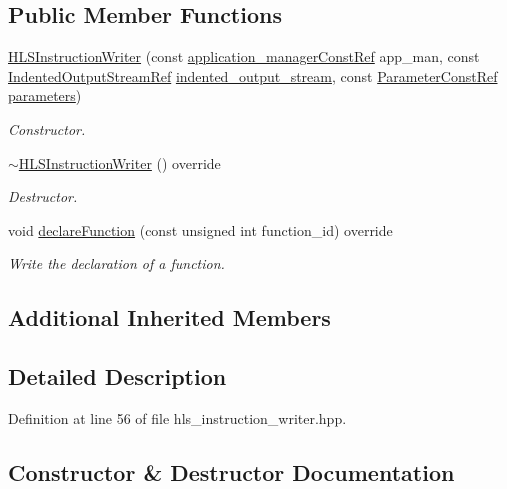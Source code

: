 \subsection*{Public Member Functions}
\begin{DoxyCompactItemize}
\item 
\hyperlink{classHLSInstructionWriter_ae416bfd458712b3bbc747e19e9aa1467}{H\+L\+S\+Instruction\+Writer} (const \hyperlink{application__manager_8hpp_abb985163a2a3fb747f6f03b1eaadbb44}{application\+\_\+manager\+Const\+Ref} app\+\_\+man, const \hyperlink{indented__output__stream_8hpp_ab32278e11151ef292759c88e99b77feb}{Indented\+Output\+Stream\+Ref} \hyperlink{classInstructionWriter_a8d06403d2bdb8f66559e2d4c2f1f1b48}{indented\+\_\+output\+\_\+stream}, const \hyperlink{Parameter_8hpp_a37841774a6fcb479b597fdf8955eb4ea}{Parameter\+Const\+Ref} \hyperlink{classInstructionWriter_a331d7d35c5526ead7951c74f4ecbe667}{parameters})
\begin{DoxyCompactList}\small\item\em Constructor. \end{DoxyCompactList}\item 
\hyperlink{classHLSInstructionWriter_ae60b4108cd5e97dcec2cb1505fa0b224}{$\sim$\+H\+L\+S\+Instruction\+Writer} () override
\begin{DoxyCompactList}\small\item\em Destructor. \end{DoxyCompactList}\item 
void \hyperlink{classHLSInstructionWriter_af6de1a6a4a37f62779bc688ad89a0a08}{declare\+Function} (const unsigned int function\+\_\+id) override
\begin{DoxyCompactList}\small\item\em Write the declaration of a function. \end{DoxyCompactList}\end{DoxyCompactItemize}
\subsection*{Additional Inherited Members}


\subsection{Detailed Description}


Definition at line 56 of file hls\+\_\+instruction\+\_\+writer.\+hpp.



\subsection{Constructor \& Destructor Documentation}
\mbox{\label{classHLSInstructionWriter_ae416bfd458712b3bbc747e19e9aa1467}} 
